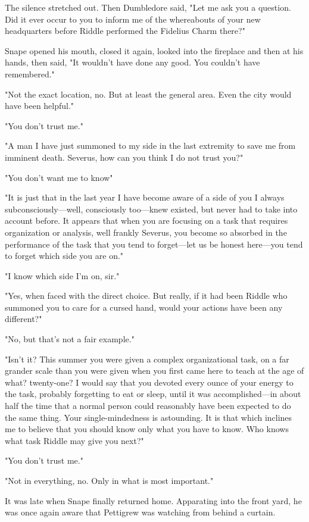 The silence stretched out. Then Dumbledore said, "Let me ask you a question. Did it ever occur to you to inform me of the whereabouts of your new headquarters before Riddle performed the Fidelius Charm there?"

Snape opened his mouth, closed it again, looked into the fireplace and then at his hands, then said, "It wouldn't have done any good. You couldn't have remembered."

"Not the exact location, no. But at least the general area. Even the city would have been helpful."

"You don't trust me."

"A man I have just summoned to my side in the last extremity to save me from imminent death. Severus, how can you think I do not trust you?"

"You don't want me to know{\el}"

"It is just that in the last year I have become aware of a side of you I always subconsciously—well, consciously too—knew existed, but never had to take into account before. It appears that when you are focusing on a task that requires organization or analysis, well frankly Severus, you become so absorbed in the performance of the task that you tend to forget—let us be honest here—you tend to forget which side you are on."

"I know which side I'm on, sir."

"Yes, when faced with the direct choice. But really, if it had been Riddle who summoned you to care for a cursed hand, would your actions have been any different?"

"No, but that's not a fair example."

"Isn't it? This summer you were given a complex organizational task, on a far grander scale than you were given when you first came here to teach at the age of what? twenty-one? I would say that you devoted every ounce of your energy to the task, probably forgetting to eat or sleep, until it was accomplished—in about half the time that a normal person could reasonably have been expected to do the same thing. Your single-mindedness is astounding. It is that which inclines me to believe that you should know only what you have to know. Who knows what task Riddle may give you next?"

"You don't trust me."

"Not in everything, no. Only in what is most important."

It was late when Snape finally returned home. Apparating into the front yard, he was once again aware that Pettigrew was watching from behind a curtain.

